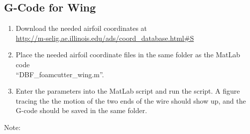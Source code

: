 \documentclass[titlepage,12pt,letter]{report}
\numberwithin{equation}{chapter}
\begin{document}
\subsection{G-Code for Wing}
\begin{enumerate}[noitemsep,topsep=0pt] 
	\item Download the needed airfoil coordinates at \\ \href{http://m-selig.ae.illinois.edu/ads/coord_database.html#S}{http://m-selig.ae.illinois.edu/ads/coord\_database.html\#S}
	\item Place the needed airfoil coordinate files in the same folder as the MatLab code \\ ``DBF\_foamcutter\_wing.m''.
	\item Enter the parameters into the MatLab script and run the script. A figure tracing the the motion of the two ends of the wire should show up, and the G-code should be saved in the same folder.
\end{enumerate}

\noindent Note:
\end{document}
